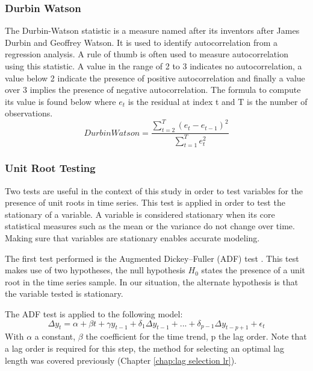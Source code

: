 \subsubsection{Durbin Watson}

The Durbin-Watson statistic is a measure named after its inventors after James Durbin and Geoffrey Watson. It is used to identify autocorrelation from a regression analysis. A rule of thumb is often used to measure autocorrelation using this statistic. A value in the range of 2 to 3 indicates no autocorrelation, a value below 2 indicate the presence of positive autocorrelation and finally a value over 3 implies the presence of negative autocorrelation. The formula to compute its value is found below where $e_{t}$ is the residual at index t and T is the number of observations.
\begin{equation}
    DurbinWatson = \frac{\sum_{t=2}^{T}(e_{t} - e_{t-1})^{2}}{\sum_{t=1}^{T}e_{t}^{2}}
\end{equation}

\subsubsection{Unit Root Testing}

Two tests are useful in the context of this study in order to test variables for the presence of unit roots in time series. This test is applied in order to test the stationary of a variable. A variable is considered stationary when  its core statistical measures such as the mean or the variance do not change over time. Making sure that variables are stationary enables accurate modeling.

The first test performed is the Augmented Dickey–Fuller (ADF) test \citep{fuller2009introduction}. This test makes use of two hypotheses, the null hypothesis $H_0$ states the presence of a unit root in the time series sample. In our situation, the alternate hypothesis is that the variable tested is stationary.

The ADF test is applied to the following model:
\begin{equation}
    \Delta y_{t} = \alpha + \beta t + \gamma y_{t-1} + \delta_{1}\Delta y_{t-1} + ... + \delta_{p-1}\Delta y_{t-p+1} + \epsilon_{t} 
\end{equation}
With $\alpha$ a constant, $\beta$ the coefficient for the time trend, p the lag order. Note that a lag order is required for this step, the method for selecting an optimal lag length was covered previously (Chapter \ref{chap:lag selection lr}).

